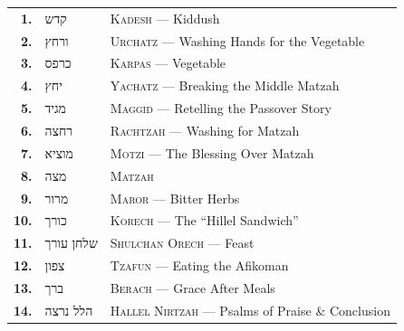 \documentclass[11pt, openany]{book}
\newcommand{\texthebrew}[1]{{\hebrewfont\TeXXeTstate=1\beginR #1\endR}}
\begin{document}
\begin{center}
\renewcommand{\arraystretch}{1.8}
\begin{tabular}{r@{\quad}l@{\qquad}l}
  \textcolor{sedergold}{\sffamily\bfseries 1.} &
    \texthebrew{קדש} &
    \textsc{Kadesh} --- Kiddush \\
  \textcolor{sedergold}{\sffamily\bfseries 2.} &
    \texthebrew{ורחץ} &
    \textsc{Urchatz} --- Washing Hands for the Vegetable \\
  \textcolor{sedergold}{\sffamily\bfseries 3.} &
    \texthebrew{כרפס} &
    \textsc{Karpas} --- Vegetable \\
  \textcolor{sedergold}{\sffamily\bfseries 4.} &
    \texthebrew{יחץ} &
    \textsc{Yachatz} --- Breaking the Middle Matzah \\
  \textcolor{sedergold}{\sffamily\bfseries 5.} &
    \texthebrew{מגיד} &
    \textsc{Maggid} --- Retelling the Passover Story \\
  \textcolor{sedergold}{\sffamily\bfseries 6.} &
    \texthebrew{רחצה} &
    \textsc{Rachtzah} --- Washing for Matzah \\
  \textcolor{sedergold}{\sffamily\bfseries 7.} &
    \texthebrew{מוציא} &
    \textsc{Motzi} --- The Blessing Over Matzah \\
  \textcolor{sedergold}{\sffamily\bfseries 8.} &
    \texthebrew{מצה} &
    \textsc{Matzah} \\
  \textcolor{sedergold}{\sffamily\bfseries 9.} &
    \texthebrew{מרור} &
    \textsc{Maror} --- Bitter Herbs \\
  \textcolor{sedergold}{\sffamily\bfseries 10.} &
    \texthebrew{כורך} &
    \textsc{Korech} --- The ``Hillel Sandwich'' \\
  \textcolor{sedergold}{\sffamily\bfseries 11.} &
    \texthebrew{שלחן עורך} &
    \textsc{Shulchan Orech} --- Feast \\
  \textcolor{sedergold}{\sffamily\bfseries 12.} &
    \texthebrew{צפון} &
    \textsc{Tzafun} --- Eating the Afikoman \\
  \textcolor{sedergold}{\sffamily\bfseries 13.} &
    \texthebrew{ברך} &
    \textsc{Berach} --- Grace After Meals \\
  \textcolor{sedergold}{\sffamily\bfseries 14.} &
    \texthebrew{הלל נרצה} &
    \textsc{Hallel Nirtzah} --- Psalms of Praise \& Conclusion \\
\end{tabular}
\end{center}

\vspace{\fill}
\end{document}
